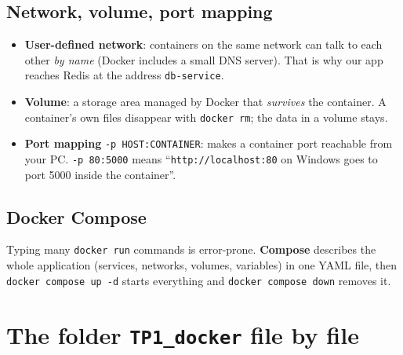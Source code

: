 \documentclass[11pt,a4paper]{article}
\begin{document}
\subsection{Network, volume, port mapping}
\begin{itemize}[leftmargin=1.3em]
\item \textbf{User-defined network}: containers on the same network can talk to each other \emph{by name} (Docker includes a small DNS server). That is why our app reaches Redis at the address \texttt{db-service}.
\item \textbf{Volume}: a storage area managed by Docker that \emph{survives} the container. A container's own files disappear with \texttt{docker rm}; the data in a volume stays.
\item \textbf{Port mapping} \texttt{-p HOST:CONTAINER}: makes a container port reachable from your PC. \texttt{-p 80:5000} means ``\texttt{http://localhost:80} on Windows goes to port 5000 inside the container''.
\end{itemize}

\subsection{Docker Compose}
Typing many \texttt{docker run} commands is error-prone. \textbf{Compose} describes the whole
application (services, networks, volumes, variables) in one YAML file, then
\texttt{docker compose up -d} starts everything and \texttt{docker compose down} removes it.

\section{The folder \texttt{TP1\_docker} file by file}
\end{document}
